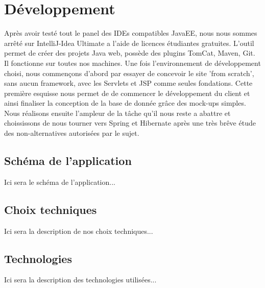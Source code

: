 \section{Développement}
Après avoir testé tout le panel des IDEs compatibles JavaEE, nous nous sommes arrêté sur IntelliJ-Idea Ultimate a l'aide de licences étudiantes gratuites.
L'outil permet de créer des projets Java web, possède des plugins TomCat, Maven, Git. Il fonctionne sur toutes nos machines.
Une fois l'environnement de développement choisi, nous commençons d'abord par essayer de concevoir le site 'from scratch', sans aucun framework, avec les Servlets et JSP comme seules fondations.
Cette première esquisse nous permet de de commencer le développement du client et ainsi finaliser la conception de la base de donnée grâce des mock-ups simples.
Nous réalisons ensuite l'ampleur de la tâche qu'il nous reste a abattre et choississons de nous tourner vers Spring et Hibernate après une très brêve étude des non-alternatives autorisées par le sujet.

\subsection{Schéma de l'application}
Ici sera le schéma de l'application...

\subsection{Choix techniques}
Ici sera la description de nos choix techniques...

\subsection{Technologies}
Ici sera la description des technologies utilisées...
